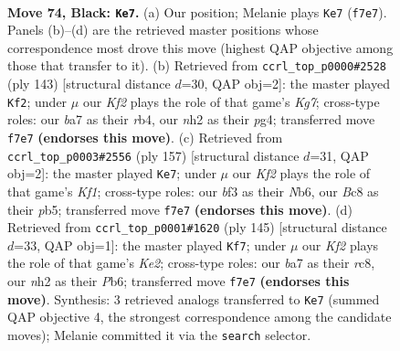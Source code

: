 \documentclass[11pt]{article}
\begin{document}
\clearpage

\begin{figure}[p]\centering
\begin{subfigure}{0.46\textwidth}\centering
\resizebox{\linewidth}{!}{%
\newchessgame
\chessboard[
  setfen={2b5/B4k2/8/2K5/PP6/5B1p/1R5N/6r1 b - - 6 74},
  showmover=false,
  pgfstyle=straightmove, color=movearrow, markmove={f7-e7}
]}
\caption{}
\end{subfigure}\hfill
\begin{subfigure}{0.46\textwidth}\centering
\resizebox{\linewidth}{!}{%
\newchessgame
\chessboard[
  setfen={8/5p2/8/1K3Bb1/1R4P1/8/6k1/2r5 b - - 5 72},
  showmover=false,
  pgfstyle=straightmove, color=movearrow, markmove={g2-f2}
]}
\caption{}
\end{subfigure}
\\[4pt]
\begin{subfigure}{0.46\textwidth}\centering
\resizebox{\linewidth}{!}{%
\newchessgame
\chessboard[
  setfen={5k2/8/1n6/1P3Bp1/3r4/1R4KP/8/8 b - - 7 79},
  showmover=false,
  pgfstyle=straightmove, color=movearrow, markmove={f8-e7}
]}
\caption{}
\end{subfigure}\hfill
\begin{subfigure}{0.46\textwidth}\centering
\resizebox{\linewidth}{!}{%
\newchessgame
\chessboard[
  setfen={2R5/4k3/1p6/1P6/8/2KBb1r1/8/8 b - - 9 73},
  showmover=false,
  pgfstyle=straightmove, color=movearrow, markmove={e7-f7}
]}
\caption{}
\end{subfigure}
\caption{\textbf{Move 74, Black: \texttt{Ke7}.} (a) Our position; Melanie plays \texttt{Ke7} (\texttt{f7e7}). Panels (b)--(d) are the retrieved master positions whose correspondence most drove this move (highest QAP objective among those that transfer to it). (b) Retrieved from \texttt{ccrl\_top\_p0000\#2528} (ply 143) [structural distance $d$=30, QAP obj=2]: the master played \texttt{Kf2}; under $\mu$ our \emph{Kf2} plays the role of that game's \emph{Kg7}; cross-type roles: our \emph{b}a7 as their \emph{r}b4, our \emph{n}h2 as their \emph{p}g4; transferred move \texttt{f7e7} \textbf{(endorses this move)}. (c) Retrieved from \texttt{ccrl\_top\_p0003\#2556} (ply 157) [structural distance $d$=31, QAP obj=2]: the master played \texttt{Ke7}; under $\mu$ our \emph{Kf2} plays the role of that game's \emph{Kf1}; cross-type roles: our \emph{b}f3 as their \emph{N}b6, our \emph{B}c8 as their \emph{p}b5; transferred move \texttt{f7e7} \textbf{(endorses this move)}. (d) Retrieved from \texttt{ccrl\_top\_p0001\#1620} (ply 145) [structural distance $d$=33, QAP obj=1]: the master played \texttt{Kf7}; under $\mu$ our \emph{Kf2} plays the role of that game's \emph{Ke2}; cross-type roles: our \emph{b}a7 as their \emph{r}c8, our \emph{n}h2 as their \emph{P}b6; transferred move \texttt{f7e7} \textbf{(endorses this move)}. Synthesis: 3 retrieved analogs transferred to \texttt{Ke7} (summed QAP objective 4, the strongest correspondence among the candidate moves); Melanie committed it via the \texttt{search} selector.}
\label{fig:thought-m147}
\end{figure}
\end{document}
